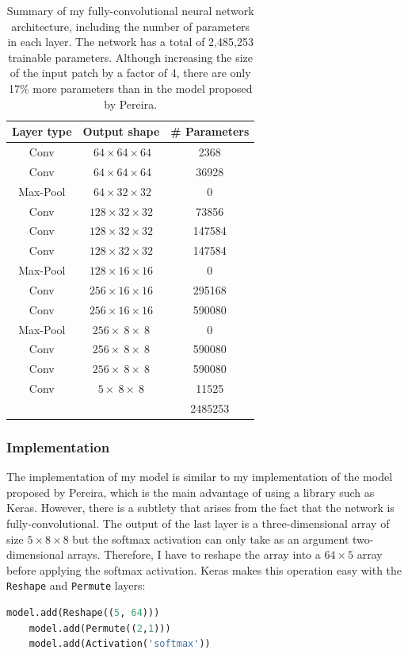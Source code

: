 \documentclass[12pt,a4paper,twoside,openright]{report}
\begin{document}
\begin{table}[h]
\centering	
\begin{tabular}{ c c S[table-format=7.0] } 
\textbf{Layer type} & \textbf{Output shape} & \textbf{\# Parameters} \\
 \hline
 Conv 		& $\ 64 	\times 64 	\times 64$ 	& 2368 \\ 
 Conv 		& $\ 64 	\times 64 	\times 64$ 	& 36928 \\ 
Max-Pool 	& $\ 64 	\times 32 	\times 32$ 	& 0\\
 Conv 		& $128 		\times 32 	\times 32$	& 73856 \\ 
 Conv 		& $128 		\times 32 	\times 32$ 	& 147584 \\ 
 Conv 		& $128 		\times 32 	\times 32$ 	& 147584 \\ 
Max-Pool 	& $128 		\times 16 	\times 16$	& 0\\
 Conv 		& $256 		\times 16 	\times 16$ 	& 295168 \\ 
 Conv 		& $256 		\times 16 	\times 16$ 	& 590080 \\ 
Max-Pool 	& $256 		\times\ 8 	\times\ 8$	& 0\\
 Conv 		& $256 		\times\ 8 	\times\ 8$	& 590080 \\ 
 Conv 		& $256 		\times\ 8 	\times\ 8$ 	& 590080 \\ 
 Conv 		& $5 		\times\ 8 	\times\ 8$ 	& 11525 \\ 
\hhline{~~=}
\rule{0pt}{3ex}    
&& 2485253\\
\end{tabular}
\caption[Summary of my fully-convolutional neural network architecture.]{Summary of my fully-convolutional neural network architecture, including the number of parameters in each layer. The network has a total of 2,485,253 trainable parameters. Although increasing the size of the input patch by a factor of 4, there are only 17\% more parameters than in the model proposed by Pereira.}
\label{table:my_model}
\end{table}

\subsubsection{Implementation}
The implementation of my model is similar to my implementation of the model proposed by Pereira, which is the main advantage of using a library such as Keras. However, there is a subtlety that arises from the fact that the network is fully-convolutional. The output of the last layer is a three-dimensional array of size $5 \times 8 \times 8$ but the softmax activation can only take as an argument two-dimensional arrays. Therefore, I have to reshape the array into a $64 \times 5$ array before applying the softmax activation. Keras makes this operation easy with the \texttt{Reshape} and \texttt{Permute} layers:
\begin{lstlisting}[style=python, language=Python]
	model.add(Reshape((5, 64)))
	model.add(Permute((2,1)))
	model.add(Activation('softmax'))
\end{lstlisting}
\end{document}

